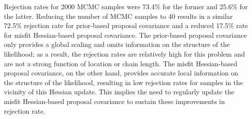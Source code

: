 Rejection rates for 2000 MCMC samples were 73.4\% for the former and
25.6\% for the latter.  Reducing the number of MCMC samples to 40
results in a similar 72.5\% rejection rate for prior-based proposal
covariance and a reduced 17.5\% rate for misfit Hessian-based proposal
covariance.  The prior-based proposal covariance only provides a
global scaling and omits information on the structure of the
likelihood; as a result, the rejection rates are relatively high for
this problem and are not a strong function of location or chain
length.  The misfit Hessian-based proposal covariance, on the other
hand, provides accurate local information on the structure of the
likelihood, resulting in low rejection rates for samples in the
vicinity of this Hessian update.  This implies the need to regularly
update the misfit Hessian-based proposal covariance to sustain these
improvements in rejection rate.

